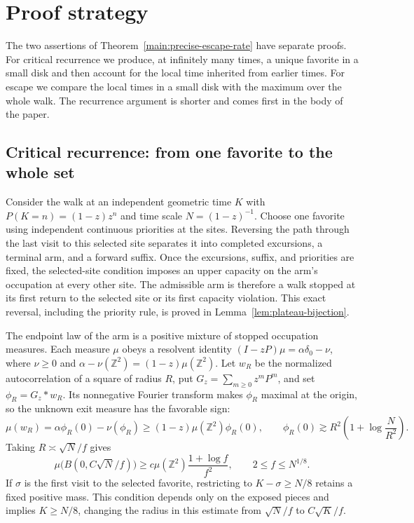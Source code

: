 \section{Proof strategy}\label{sec:proof-ideas}

The two assertions of Theorem~\ref{main:precise-escape-rate} have separate
proofs. For critical recurrence we produce, at infinitely many times, a
unique favorite in a small disk and then account for the local time inherited
from earlier times. For escape we compare the local times in a small disk
with the maximum over the whole walk. The recurrence argument is shorter and
comes first in the body of the paper.

\subsection{Critical recurrence: from one favorite to the whole set}

Consider the walk at an independent geometric time $K$ with
$P(K=n)=(1-z)z^n$ and time scale $N=(1-z)^{-1}$. Choose one favorite using
independent continuous priorities at the sites. Reversing the path through
the last visit to this selected site separates it into completed excursions,
a terminal arm, and a forward suffix. Once the excursions, suffix, and
priorities are fixed, the selected-site condition imposes an upper capacity
on the arm's occupation at every other site. The admissible arm is therefore
a walk stopped at its first return to the selected site or its first capacity
violation. This exact reversal, including the priority rule, is proved in
Lemma~\ref{lem:plateau-bijection}.

The endpoint law of the arm is a positive mixture of stopped occupation
measures. Each measure $\mu$ obeys a resolvent identity
$(I-zP)\mu=\alpha\delta_0-\nu$, where $\nu\ge0$ and
$\alpha-\nu(\mathbb Z^2)=(1-z)\mu(\mathbb Z^2)$. Let $w_R$ be the
normalized autocorrelation of a square of radius $R$, put
$G_z=\sum_{m\ge0}z^mP^m$, and set $\phi_R=G_z*w_R$.
Its nonnegative Fourier transform makes $\phi_R$ maximal at the origin,
so the unknown exit measure has the favorable sign:
\[
 \mu(w_R)=\alpha\phi_R(0)-\nu(\phi_R)
 \ge(1-z)\mu(\mathbb Z^2)\phi_R(0),\qquad
 \phi_R(0)\gtrsim R^2\left(1+\log\frac N{R^2}\right).
\]
Taking $R\asymp\sqrt N/f$ gives
\begin{equation}\label{eq:ideas-resolvent-gain}
 \mu\bigl(B(0,C\sqrt N/f)\bigr)
 \ge c\mu(\mathbb Z^2)\frac{1+\log f}{f^2},
 \qquad 2\le f\le N^{1/8}.
\end{equation}
If $\sigma$ is the first visit to the selected favorite, restricting to
$K-\sigma\ge N/8$ retains a fixed positive mass. This condition depends
only on the exposed pieces and implies $K\ge N/8$, changing the radius
in this estimate from $\sqrt N/f$ to $C\sqrt K/f$.

